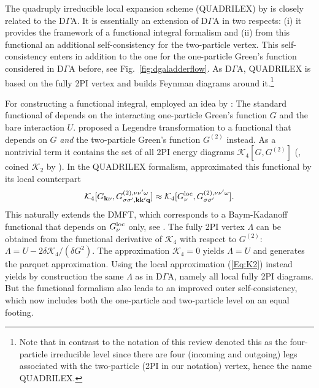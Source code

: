 \documentclass[rmp,aps,reprint,amsmath,amssymb,superscriptaddress,showpacs,nofootinbib]{revtex4-1}
\begin{document}
The quadruply irreducible local expansion scheme (QUADRILEX) by  is closely related to the D$\Gamma$A. It is essentially an extension of D$\Gamma$A in two respects: (i) it provides the framework of a functional integral formalism and (ii) from this functional an additional self-consistency for the two-particle vertex. This self-consistency enters in addition to the one for the one-particle Green's function considered in D$\Gamma$A before, see Fig.~\ref{fig:dgaladderflow}. As D$\Gamma$A,  QUADRILEX is based on the fully 2PI vertex and builds Feynman diagrams around it.\footnote{Note that in contrast to the notation of this review  denoted this as the  four-particle irreducible level since there are four (incoming and outgoing) legs associated with the two-particle (2PI in our notation) vertex, hence the name QUADRILEX.}

For constructing a functional integral,   employed an idea by : The standard functional of   depends on the interacting one-particle Green's function $G$ and the bare  interaction $U$.   proposed a Legendre transformation to a functional that depends on  $G$ {\em and} the two-particle Green's function $G^{(2)}$ instead.  As a nontrivial term it contains the set of all 2PI energy diagrams $\mathcal{K}_{4}[G,G^{(2)}]$ (, coined  $\mathcal{K}_{2}$ by ). In the  QUADRILEX formalism,  approximated this functional by its local counterpart
\begin{equation}
\label{Eq:K2}
  \mathcal{K}_{4}[G_{\mathbf{k}\nu},G_{\sigma\sigma',\mathbf{k}\mathbf{k'}\mathbf{q}}^{(2),\nu\nu'\omega}] \approx \mathcal{K}_{4}[G^{\rm loc}_\nu,G_{\sigma\sigma'}^{(2),\nu\nu'\omega}].
\end{equation}
This naturally extends the DMFT, which corresponds to a Baym-Kadanoff functional that depends on $G^{\rm loc}_\nu$ only, see . The fully  2PI vertex $\Lambda$ can be obtained from the functional derivative of $\mathcal{K}_{4}$  with respect to  $G^{(2)}$: $\Lambda=U-2{\delta}\mathcal{K}_{4}/({\delta}G^{2})$. The approximation $\mathcal{K}_{4}=0$ yields $\Lambda=U$ and generates the parquet approximation. Using the local approximation (\ref{Eq:K2}) instead yields by construction the same $\Lambda$ as in D$\Gamma$A, namely all local fully 2PI diagrams. But the functional formalism also leads to an improved outer self-consistency, which now includes both the one-particle and two-particle level on an equal footing.
\end{document}
